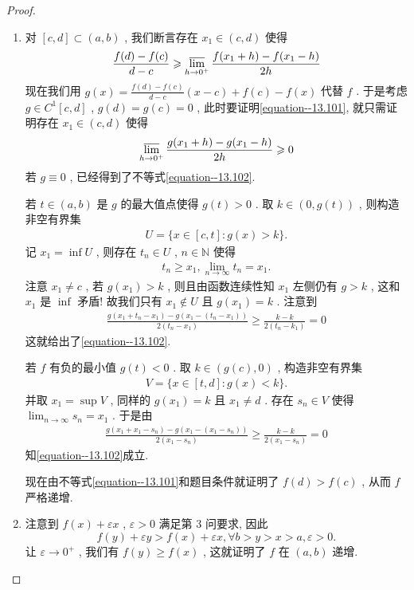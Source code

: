 \documentclass[../../main.tex]{subfiles}%
\begin{document}
\begin{proof}
\begin{enumerate}
\item 对 \([c, d] \subset (a, b)\) , 我们断言存在 \(x_1 \in (c, d)\) 使得
\begin{align}
\frac{f(d) - f(c)}{d - c} \geqslant  \varlimsup_{h \to 0^+} \frac{f(x_1 + h) - f(x_1 - h)}{2h} \label{equation--13.101}
\end{align}
现在我们用 \(g(x) = \frac{f(d) - f(c)}{d - c}(x - c) + f(c) - f(x)\) 代替 \(f\) . 于是考虑 \(g \in C^1[c, d]\) , \(g(d) = g(c) = 0\) , 此时要证明\eqref{equation--13.101}, 就只需证明存在 \(x_1 \in (c, d)\) 使得
\begin{align}
\varlimsup_{h \to 0^+} \frac{g(x_1 + h) - g(x_1 - h)}{2h} \geqslant  0 \label{equation--13.102}
\end{align}
若 \(g \equiv 0\) , 已经得到了不等式\eqref{equation--13.102}.

若 \(t \in (a, b)\) 是 \(g\) 的最大值点使得 \(g(t) > 0\) . 取 \(k \in (0, g(t))\) , 则构造非空有界集
\begin{align*}
U = \{x \in [c, t] : g(x) > k\}.
\end{align*}
记 \(x_1 = \inf U\) , 则存在 \(t_n \in U\) , \(n \in \mathbb{N}\) 使得
\begin{align*}
t_n \geqslant  x_1 , \lim_{n \to \infty} t_n = x_1.
\end{align*}
注意 \(x_1 \neq c\) , 若 \(g(x_1) > k\) , 则且由函数连续性知 \(x_1\) 左侧仍有 \(g > k\) , 这和 \(x_1\) 是 \(\inf\) 矛盾! 故我们只有 \(x_1 \notin U\) 且 \(g(x_1) = k\) . 注意到
\begin{align*}
\frac{g(x_1 + t_n - x_1) - g(x_1 - (t_n - x_1))}{2(t_n - x_1)} \geqslant  \frac{k - k}{2(t_n - k_1)} = 0
\end{align*}
这就给出了\eqref{equation--13.102}.

若 \(f\) 有负的最小值 \(g(t) < 0\) . 取 \(k \in (g(c), 0)\) , 构造非空有界集
\begin{align*}
V = \{x \in [t, d] : g(x) < k\}.
\end{align*}
并取 \(x_1 = \sup V\) , 同样的 \(g(x_1) = k\) 且 \(x_1 \neq d\) . 存在 \(s_n \in V\) 使得 \(\lim_{n \to \infty} s_n = x_1\) . 于是由
\begin{align*}
\frac{g(x_1 + x_1 - s_n) - g(x_1 - (x_1 - s_n))}{2(x_1 - s_n)} \geqslant  \frac{k - k}{2(x_1 - s_n)} = 0
\end{align*}
知\eqref{equation--13.102}成立.

现在由不等式\eqref{equation--13.101}和题目条件就证明了 \(f(d) > f(c)\) , 从而 \(f\) 严格递增.

\item 注意到 \(f(x) + \varepsilon x\) , \(\varepsilon > 0\) 满足第 3 问要求, 因此
\[f(y) + \varepsilon y > f(x) + \varepsilon x ,\forall b > y > x > a , \varepsilon > 0.\]
让 \(\varepsilon \to 0^+\) , 我们有 \(f(y) \geqslant  f(x)\) , 这就证明了 \(f\) 在 \((a, b)\) 递增. 
\end{enumerate}

\end{proof}
\end{document}
